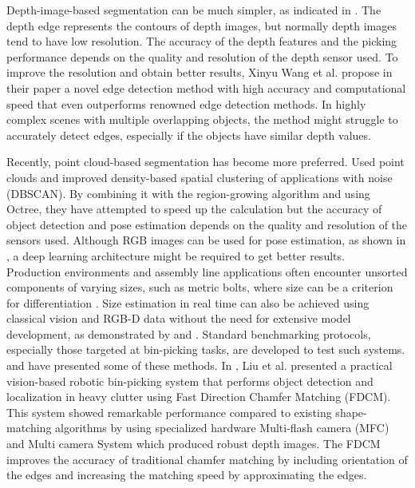 \documentclass[conference]{IEEEtran}
\begin{document}
Depth-image-based segmentation can be much simpler, as indicated in \cite{A_study_on_picking_objects_in_cluttered}. The depth edge represents the contours of depth images, but normally depth images tend to have low resolution. The accuracy of the depth features and the picking performance depends on the quality and resolution of the depth sensor used. To improve the resolution and obtain better results, Xinyu Wang et al. propose in their paper \cite{LBP_based_edge_detection} a novel edge detection method with high accuracy and computational speed that even outperforms renowned edge detection methods. In highly complex scenes with multiple overlapping objects, the method might struggle to accurately detect edges, especially if the objects have similar depth values. 

Recently, point cloud-based segmentation has become more preferred. \cite{fast_and_robust_bin_picking} Used point clouds and improved density-based spatial clustering of applications with noise (DBSCAN). By combining it with the region-growing algorithm and using Octree, they have attempted to speed up the calculation but the accuracy of object detection and pose estimation depends on the quality and resolution of the sensors used. Although RGB images can be used for pose estimation, as shown in \cite{templates_for_3D}, a deep learning architecture might be required to get better results. 
\\Production environments and assembly line applications often encounter unsorted components of varying sizes, such as metric bolts, where size can be a criterion for differentiation \cite{Development_of_machine_vision}. Size estimation in real time can also be achieved using classical vision and RGB-D data without the need for extensive model development, as demonstrated by \cite{On_tree_mango_fruits} and \cite{Real_time_object_measurement}. Standard benchmarking protocols, especially those targeted at bin-picking tasks, are developed to test such systems. \cite{MorganPaper} and \cite{Evaluating_robot_bin_picking_performance} have presented some of these methods. In \cite{Fast_object_localization}, Liu et al. presented a practical vision-based robotic bin-picking system that performs object detection and localization in heavy clutter using Fast Direction Chamfer Matching (FDCM). This system showed remarkable performance compared to existing shape-matching algorithms by using specialized hardware Multi-flash camera (MFC) and Multi camera System which produced robust depth images. The FDCM improves the accuracy of traditional chamfer matching by including orientation of the edges and increasing the matching speed by approximating the edges.
\end{document}
